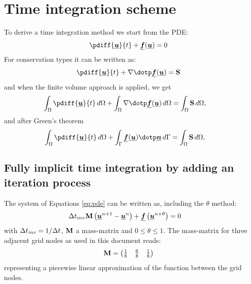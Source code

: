 \chapter{Time integration scheme}\label{sec:time_integration}
To derive a time integration method we start from the PDE:
\begin{align}
    \pdiff{\vec{u}}{t} + \vec{f}(\vec{u}) = 0\label{eq:pde}
\end{align}
For conservation types it can be written as:
\begin{align}
    \pdiff{\vec{u}}{t} + \nabla \dotp \vec{f}(\vec{u}) = \mat{S}
\end{align}
and when the finite volume approach is applied, we get
\begin{align}
    \int_\Omega \pdiff{\vec{u}}{t}\, d\Omega + \int_\Omega \nabla \dotp \vec{f}(\vec{u})\, d\Omega&= \int_\Omega \mat{S}\, d\Omega,
\end{align}
and after Green's theorem
\begin{align}
    \int_\Omega \pdiff{\vec{u}}{t}\, d\Omega + \int_\Gamma \vec{f}(\vec{u}) \dotp \vec{n}\, d\Gamma&= \int_\Omega \mat{S}\, d\Omega,
\end{align}
\section{Fully implicit time integration by adding an iteration process}\label{sec:fully_implicit}
The system of Equations \eqref{eq:pde} can be written as, including the $\theta$ method:
\begin{align}
    &\Delta t_{inv} \mbox{\boldmath ${\mathrm{M}}$} \left( \mbox{\boldmath $\underline{u}$}^{n+1} - \mbox{\boldmath $\underline{u}$}^{n} \right)  +
    \mbox{\boldmath $\underline{f}$} \left( \mbox{\boldmath $\underline{u}$}^{n+\theta} \right) = 0 \label{eq:discretized}
\end{align}
with $\Delta t_{\mathit{inv}} = 1/\Delta t$, $\mbox{\boldmath ${\mathrm{M}}$}$ a mass-matrix and $0 \leq \theta \leq 1$.
The mass-matrix for three adjacent grid nodes as used in this document reads:
\begin{align}
    \mbox{\boldmath ${\mathrm{M}}$} = \begin{pmatrix} \frac{1}{8} \quad \frac{6}{8} \quad \frac{1}{8} \end{pmatrix}
    \label{eq:definition_mass_matrix}
\end{align}
representing a piecewise linear approximation of the function between the grid nodes.

